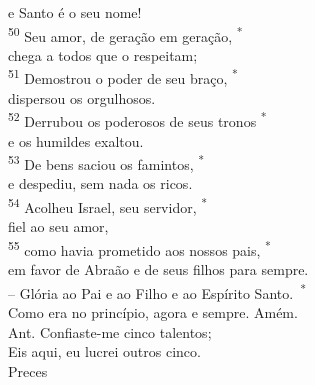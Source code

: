 \documentclass{book}
\begin{document}
\begin{center}
    e Santo é o seu nome! \\
    \textsuperscript{\underline{\hspace{.07in}}\textcolor{VioletRed1}{50}} Seu amor, de geração em geração, \textsuperscript{*} \\
    chega a todos que o respeitam;
    \vspace{.2cm} \\
    \textsuperscript{\underline{\hspace{.07in}}\textcolor{VioletRed1}{51}} Demostrou o poder de seu braço, \textsuperscript{*} \\
    dispersou os orgulhosos. \\
    \textsuperscript{\underline{\hspace{.07in}}\textcolor{VioletRed1}{52}} Derrubou os poderosos de seus tronos \textsuperscript{*} \\
    e os humildes exaltou.
    \vspace{.2cm} \\
    \textsuperscript{\underline{\hspace{.07in}}\textcolor{VioletRed1}{53}} De bens saciou os famintos, \textsuperscript{*}\\
    e despediu, sem nada os ricos. \\
    \textsuperscript{\underline{\hspace{.07in}}\textcolor{VioletRed1}{54}} Acolheu Israel, seu servidor, \textsuperscript{*} \\
    fiel ao seu amor,
    \vspace{.2cm} \\
    \textsuperscript{\underline{\hspace{.07in}}\textcolor{VioletRed1}{55}} como havia prometido aos nossos pais, \textsuperscript{*} \\
    em favor de Abraão e de seus filhos para sempre.
    \vspace{.2cm} \\
    -- Glória ao Pai e ao Filho e ao Espírito Santo.\ \textsuperscript{*} \\
    Como era no princípio, agora e sempre. Amém.
    \vspace{.2cm} \\
    \textcolor{VioletRed1}{Ant.} Confiaste-me cinco talentos; \\
    Eis aqui, eu lucrei outros cinco.
    \vspace{.2cm} \\
    \textcolor{VioletRed1}{Preces}
    \vspace{.2cm} \\

\end{center}
\end{document}
